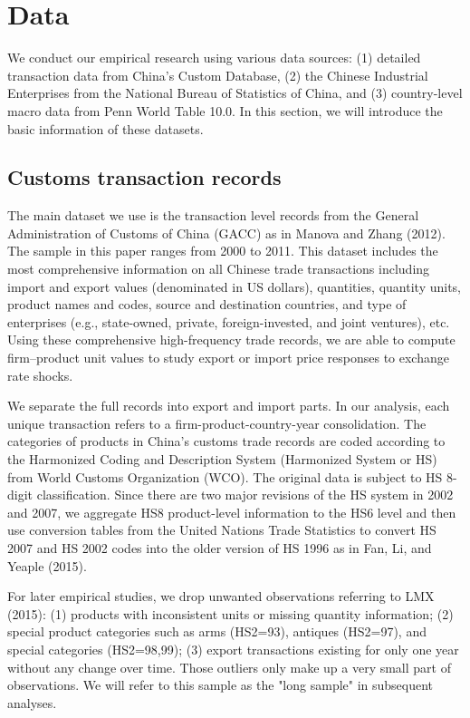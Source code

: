\chapter{Data}\label{sec-3.data}

We conduct our empirical research using various data sources: (1) detailed transaction data from China’s Custom Database, (2) the Chinese Industrial Enterprises from the National Bureau of Statistics of China, and (3) country-level macro data from Penn World Table 10.0. In this section, we will introduce the basic information of these datasets.

\section{Customs transaction records}

The main dataset we use is the transaction level records from the General Administration of Customs of China (GACC) as in Manova and Zhang (2012)\cite{manova-zhang2012}. The sample in this paper ranges from 2000 to 2011. This dataset includes the most comprehensive information on all Chinese trade transactions including import and export values (denominated in US dollars), quantities, quantity units, product names and codes, source and destination countries, and type of enterprises (e.g., state-owned, private, foreign-invested, and joint ventures), etc. Using these comprehensive high-frequency trade records, we are able to compute firm–product unit values to study export or import price responses to exchange rate shocks. 

We separate the full records into export and import parts. In our analysis, each unique transaction refers to a firm-product-country-year consolidation. The categories of products in China's customs trade records are coded according to the Harmonized Coding and Description System (Harmonized System or HS) from World Customs Organization (WCO). The original data is subject to HS 8-digit classification. Since there are two major revisions of the HS system in 2002 and 2007, we aggregate HS8 product-level information to the HS6 level and then use conversion tables from the United Nations Trade Statistics to convert HS 2007 and HS 2002 codes into the older version of HS 1996 as in Fan, Li, and Yeaple (2015)\cite{fan-li-yeaple2015}.

For later empirical studies, we drop unwanted observations referring to LMX (2015)\cite{lmx2015}: (1) products with inconsistent units or missing quantity information; (2) special product categories such as arms (HS2=93), antiques (HS2=97), and special categories (HS2=98,99); (3) export transactions existing for only one year without any change over time. Those outliers only make up a very small part of observations. We will refer to this sample as the "long sample" in subsequent analyses.

